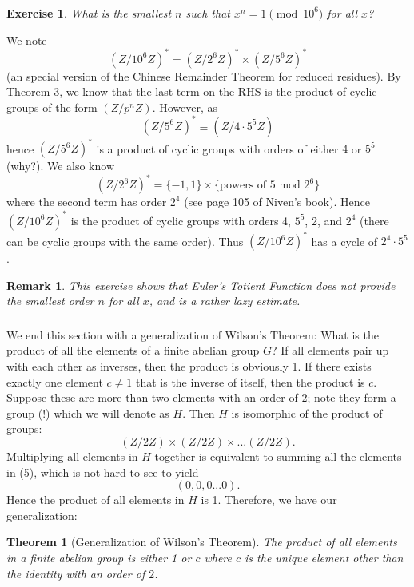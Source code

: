 \documentclass{article}
\newtheorem{theorem}{Theorem}
\newtheorem{exercise}{Exercise}
\newtheorem*{remark}{Remark}
\begin{document}
\subsubsection{}
\begin{exercise}
What is the smallest $n$ such that $x^{n} = 1 \pmod{10^6}$ for all $x$?
\end{exercise}
We note 
\begin{equation}
    (Z/10^{6}Z)^{*} = (Z/2^{6}Z)^{*} \times (Z/5^{6}Z)^{*}
\end{equation}
(an special version of the Chinese Remainder Theorem for reduced residues). By Theorem 3, we know that the last term on the RHS is the product of cyclic groups of the form $(Z/p^{n}Z)$. However, as
\begin{equation}
    (Z/5^{6}Z)^{*} \equiv (Z/4\cdot5^{5}Z)  
\end{equation}
hence $(Z/5^{6}Z)^{*}$ is a product of cyclic groups with orders of either $4$ or $5^{5}$ (why?). We also know
\begin{equation}
    (Z/2^{6}Z)^{*} = \{-1, 1\} \times \{\textrm{powers of 5 mod }2^{6}\}
\end{equation}
where the second term has order $2^{4}$ (see page 105 of Niven's book). Hence $(Z/10^{6}Z)^{*}$ is the product of cyclic groups with orders 4, $5^{5}$, 2, and $2^{4}$ (there can be cyclic groups with the same order). Thus $(Z/10^{6}Z)^{*}$ has a cycle of $2^{4} \cdot 5^{5}$.
\begin{remark}
    This exercise shows that Euler's Totient Function does not provide the smallest order $n$ for all $x$, and is a rather lazy estimate.
\end{remark}
\subsubsection{}
We end this section with a generalization of Wilson's Theorem: What is the product of all the elements of a finite abelian group $G$?
If all elements pair up with each other as inverses, then the product is obviously 1. If there exists exactly one element $c \neq 1$ that is the inverse of itself, then the product is $c$. Suppose these are more than two elements with an order of 2; note they form a group (!) which we will denote as $H$. Then $H$ is isomorphic of the product of groups:
\begin{equation}
    (Z/2Z) \times (Z/2Z) \times ... (Z/2Z).
\end{equation}
Multiplying all elements in $H$ together is equivalent to summing all the elements in (5), which is not hard to see to yield $$(0,0,0...0).$$ Hence the product of all elements in $H$ is 1. Therefore, we have our generalization:
\begin{theorem}[Generalization of Wilson's Theorem]
    The product of all elements in a finite abelian group is either 1 or $c$ where $c$ is the unique element other than the identity with an order of $2$. 
\end{theorem}
\end{document}
